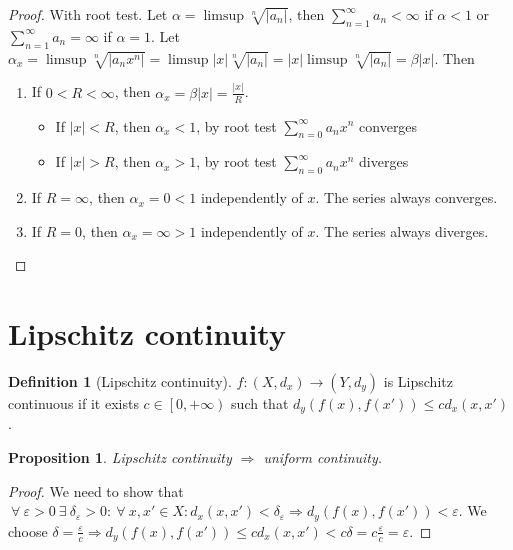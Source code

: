 \documentclass{article}
\newcommand{\DS}{\displaystyle}
\newcommand{\Ar}{\Rightarrow}
\newenvironment{enumarabic}{\begin{enumerate}[label=(\arabic*)]}{\end{enumerate}}
\newcommand{\f}[3]{#1 : #2 \rightarrow #3}
\newcommand{\intco}[1]{\left[#1\right)}
\theoremstyle{definition}
\newtheorem{definition}{Definition}[section]
\theoremstyle{definition}
\theoremstyle{plain}
\theoremstyle{plain}
\theoremstyle{plain}
\theoremstyle{plain}
\newtheorem{proposition}[theorem]{Proposition}
\theoremstyle{definition}
\theoremstyle{remark}
\theoremstyle{remark}
\theoremstyle{remark}
\theoremstyle{remark}
\newcommand{\series}{\sum_{n=1}^\infty}
\newcommand{\pseries}[1]{\sum_{n=0}^\infty #1}
\newcommand{\ForAll}{\ \forall \ }
\newcommand{\Exists}{\ \exists \ }
\newcommand{\E}{\varepsilon}
\begin{document}
\begin{proof}
  With root test. Let $\alpha = \limsup \sqrt[n]{|a_n|}$, then $\DS \series{a_n} < \infty$ if $\alpha < 1$ or $\DS \series{a_n} = \infty$ if $\alpha = 1$. Let $\alpha_x = \limsup \sqrt[n]{|a_n x^n|} = \limsup |x|\sqrt[n]{|a_n|} = |x| \limsup \sqrt[n]{|a_n|} = \beta |x|$. Then
  \begin{enumarabic}
  \item If $0 < R < \infty$, then $\alpha_x = \beta |x| = \frac{|x|}{R}$.
    \begin{itemize}
    \item If $|x| < R$, then $\alpha_x < 1$, by root test $\DS \pseries{a_n x^n}$ converges
    \item If $|x| > R$, then $\alpha_x > 1$, by root test $\DS \pseries{a_n x^n}$ diverges
    \end{itemize}
  \item If $R = \infty$, then $\alpha_x = 0 < 1$ independently of $x$. The series always converges.
  \item If $R =0$, then $\alpha_x = \infty > 1$ independently of $x$. The series always diverges.
  \end{enumarabic}
\end{proof}




\section{Lipschitz continuity}


\begin{definition}[Lipschitz continuity]
  $\f{f}{(X,d_x)}{(Y,d_y)}$ is Lipschitz continuous if it exists $c \in \intco{0,+\infty}$ such that $d_y(f(x),f(x')) \leq c d_x(x,x')$.
\end{definition}


\begin{proposition}
  Lipschitz continuity $\Ar$ uniform continuity.
\end{proposition}

\begin{proof}
  We need to show that $\ForAll \E > 0 \Exists \delta_\E > 0 : \ForAll x, x' \in X : d_x(x,x') < \delta_\E \Ar d_y(f(x),f(x')) < \E$. We choose $\delta = \frac{\E}{c} \Ar d_y(f(x),f(x')) \leq c d_x(x,x') < c \delta = c \frac{\E}{c} = \E$.
\end{proof}
\end{document}

